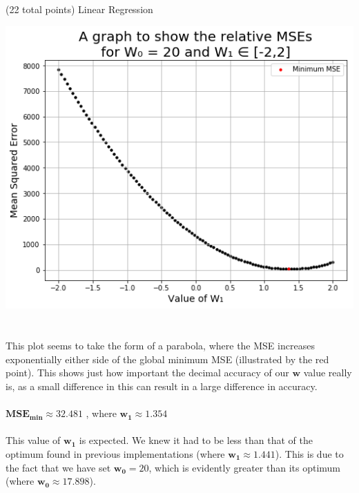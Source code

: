 \documentclass[12pt]{article}
\begin{document}
\begin{question}{(22 total points) Linear Regression}
\begin{subquestion}
\begin{answerbox}{48em}
\includegraphics [width=1\textwidth]{images/q1g-graph.png}\\
\\
\\
This plot seems to take the form of a parabola, where the MSE increases exponentially either side of the global minimum MSE (illustrated by the red point). This shows just how important the decimal accuracy of our $\mathbf{w}$ value really is, as a small difference in this can result in a large difference in accuracy.\\
\\
$\mathbf{MSE_{min}} \approx 32.481$ ,  where $\mathbf{w_1} \approx 1.354$\\
\\
This value of $\mathbf{w_1}$ is expected. We knew it had to be less than that of the optimum found in previous implementations (where $\mathbf{w_1} \approx 1.441$). This is due to the fact that we have set $\mathbf{w_0} = 20$, which is evidently greater than its optimum (where $\mathbf{w_0} \approx 17.898$).
\end{answerbox}



\end{subquestion}


 
\end{question}





\clearpage
\end{document}
